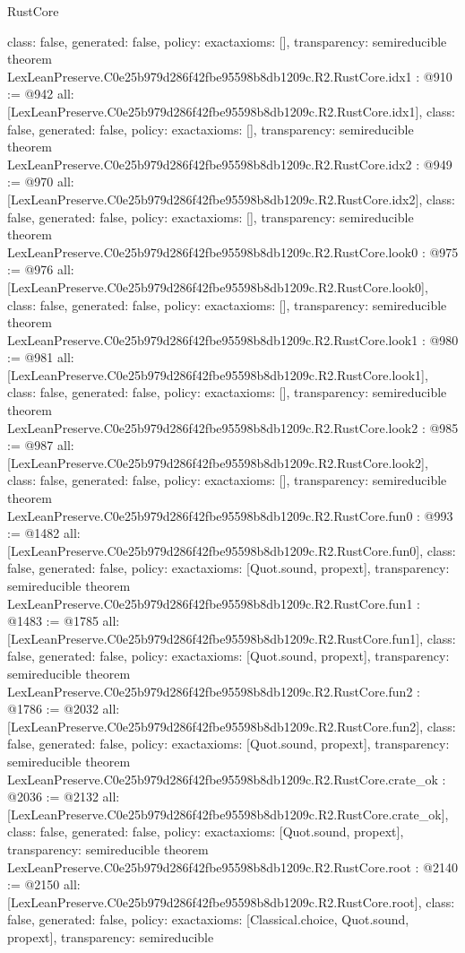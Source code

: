 \begin{lexlean}{RustCore}
\begin{coremodule}
{  class: false,
  generated: false,
  policy: exact{axioms: []},
  transparency: semireducible
}
theorem LexLeanPreserve.C0e25b979d286f42fbe95598b8db1209c.R2.RustCore.idx1 : @910 := @942 {
  all: [LexLeanPreserve.C0e25b979d286f42fbe95598b8db1209c.R2.RustCore.idx1],
  class: false,
  generated: false,
  policy: exact{axioms: []},
  transparency: semireducible
}
theorem LexLeanPreserve.C0e25b979d286f42fbe95598b8db1209c.R2.RustCore.idx2 : @949 := @970 {
  all: [LexLeanPreserve.C0e25b979d286f42fbe95598b8db1209c.R2.RustCore.idx2],
  class: false,
  generated: false,
  policy: exact{axioms: []},
  transparency: semireducible
}
theorem LexLeanPreserve.C0e25b979d286f42fbe95598b8db1209c.R2.RustCore.look0 : @975 := @976 {
  all: [LexLeanPreserve.C0e25b979d286f42fbe95598b8db1209c.R2.RustCore.look0],
  class: false,
  generated: false,
  policy: exact{axioms: []},
  transparency: semireducible
}
theorem LexLeanPreserve.C0e25b979d286f42fbe95598b8db1209c.R2.RustCore.look1 : @980 := @981 {
  all: [LexLeanPreserve.C0e25b979d286f42fbe95598b8db1209c.R2.RustCore.look1],
  class: false,
  generated: false,
  policy: exact{axioms: []},
  transparency: semireducible
}
theorem LexLeanPreserve.C0e25b979d286f42fbe95598b8db1209c.R2.RustCore.look2 : @985 := @987 {
  all: [LexLeanPreserve.C0e25b979d286f42fbe95598b8db1209c.R2.RustCore.look2],
  class: false,
  generated: false,
  policy: exact{axioms: []},
  transparency: semireducible
}
theorem LexLeanPreserve.C0e25b979d286f42fbe95598b8db1209c.R2.RustCore.fun0 : @993 := @1482 {
  all: [LexLeanPreserve.C0e25b979d286f42fbe95598b8db1209c.R2.RustCore.fun0],
  class: false,
  generated: false,
  policy: exact{axioms: [Quot.sound, propext]},
  transparency: semireducible
}
theorem LexLeanPreserve.C0e25b979d286f42fbe95598b8db1209c.R2.RustCore.fun1 : @1483 := @1785 {
  all: [LexLeanPreserve.C0e25b979d286f42fbe95598b8db1209c.R2.RustCore.fun1],
  class: false,
  generated: false,
  policy: exact{axioms: [Quot.sound, propext]},
  transparency: semireducible
}
theorem LexLeanPreserve.C0e25b979d286f42fbe95598b8db1209c.R2.RustCore.fun2 : @1786 := @2032 {
  all: [LexLeanPreserve.C0e25b979d286f42fbe95598b8db1209c.R2.RustCore.fun2],
  class: false,
  generated: false,
  policy: exact{axioms: [Quot.sound, propext]},
  transparency: semireducible
}
theorem LexLeanPreserve.C0e25b979d286f42fbe95598b8db1209c.R2.RustCore.crate_ok : @2036 := @2132 {
  all: [LexLeanPreserve.C0e25b979d286f42fbe95598b8db1209c.R2.RustCore.crate_ok],
  class: false,
  generated: false,
  policy: exact{axioms: [Quot.sound, propext]},
  transparency: semireducible
}
theorem LexLeanPreserve.C0e25b979d286f42fbe95598b8db1209c.R2.RustCore.root : @2140 := @2150 {
  all: [LexLeanPreserve.C0e25b979d286f42fbe95598b8db1209c.R2.RustCore.root],
  class: false,
  generated: false,
  policy: exact{axioms: [Classical.choice, Quot.sound, propext]},
  transparency: semireducible
}


\end{coremodule}
\end{lexlean}
